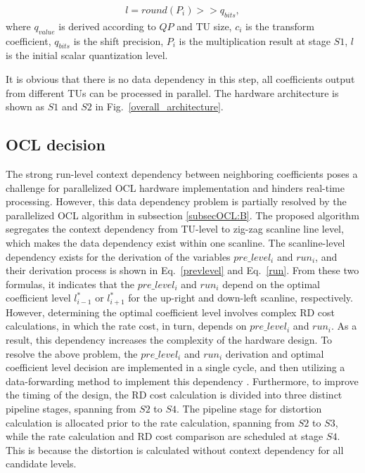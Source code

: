 \documentclass[lettersize,journal]{IEEEtran}
\begin{document}
\begin{equation}\label{l}
	\begin{aligned}
		l = round \left ( P_{i} \right ) >> q_{bits},
	\end{aligned}
\end{equation}
where $q_{value}$ is derived according to $QP$ and TU size, $c_{i}$ is the transform coefficient, $q_{bits}$ is the shift precision, $P_{i}$ is the multiplication result at stage $S1$, $l$ is the initial scalar quantization level.

It is obvious that there is no data dependency in this step, all coefficients output from different TUs can be processed in parallel. The hardware architecture is shown as $S1$ and $S2$ in Fig.~\ref{overall_architecture}. 

\subsection{OCL decision}

The strong run-level context dependency between neighboring coefficients poses a challenge for parallelized OCL hardware implementation and hinders real-time processing. However, this data dependency problem is partially resolved by the parallelized OCL algorithm in subsection \ref{subsecOCL:B}. 
The proposed algorithm segregates the context dependency from TU-level to zig-zag scanline line level, which makes the data dependency exist within one scanline. The scanline-level dependency exists for the derivation of the variables $pre\_level_i$ and $run_i$, and their derivation process is shown in Eq.~\eqref{prevlevel} and Eq.~\eqref{run}. From these two formulas, it indicates that the $pre\_level_i$ and $run_i$ depend on the optimal coefficient level $l _{i-1}^{*}$ or $l _{i+1}^{*}$ for the up-right and down-left scanline, respectively. However, determining the optimal coefficient level involves complex RD cost calculations, in which the rate cost, in turn, depends on $pre\_level_i$ and $run_i$. As a result, this dependency increases the complexity of the hardware design. To resolve the above problem, the $pre\_level_i$ and $run_i$ derivation and optimal coefficient level decision are implemented in a single cycle, and then utilizing a data-forwarding method to implement this dependency \cite{harris2010digital}. 
Furthermore, to improve the timing of the design, the RD cost calculation is divided into three distinct pipeline stages, spanning from $S2$ to $S4$. 
The pipeline stage for distortion calculation is allocated prior to the rate calculation, spanning from $S2$ to $S3$, while the rate calculation and RD cost comparison are scheduled at stage $S4$. This is because the distortion is calculated without context dependency for all candidate levels. 
\end{document}
